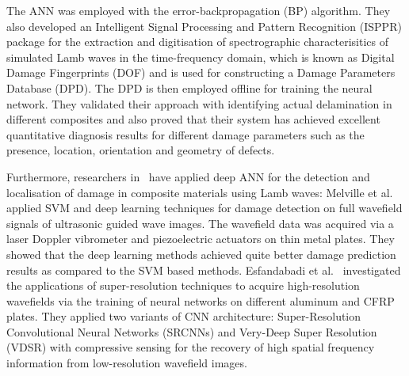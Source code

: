 The ANN was employed with the error-backpropagation (BP) algorithm. 
They also developed an Intelligent Signal Processing and Pattern Recognition (ISPPR) package for the extraction and digitisation of spectrographic characterisitics of simulated Lamb waves in the time-frequency domain, which is known as Digital Damage Fingerprints (DOF) and is used for constructing a Damage Parameters Database (DPD). 
The DPD is then employed offline for training the neural network. 
They validated their approach with identifying actual delamination in different composites and also proved that their system has achieved excellent quantitative diagnosis results for different damage parameters such as the presence, location, orientation and geometry of defects.

Furthermore, researchers in~\cite{Melville2018,esfandabadideep}  have applied deep ANN for the detection and localisation of damage in composite materials using Lamb waves:
Melville et al.~\cite{Melville2018} applied SVM and deep learning techniques for damage detection on full wavefield signals of ultrasonic guided wave images. The wavefield data was acquired via a laser Doppler vibrometer and piezoelectric actuators on thin metal plates. 
They showed that the deep learning methods achieved quite better damage prediction results as compared to the SVM based methods. 
Esfandabadi et al.~\cite{esfandabadideep} investigated the applications of super-resolution techniques to acquire high-resolution wavefields via the training of neural networks on different aluminum and CFRP plates. 
They applied two variants of CNN architecture: Super-Resolution Convolutional Neural Networks (SRCNNs) and Very-Deep Super Resolution (VDSR) with compressive sensing for the recovery of high spatial frequency information from low-resolution wavefield images.           

